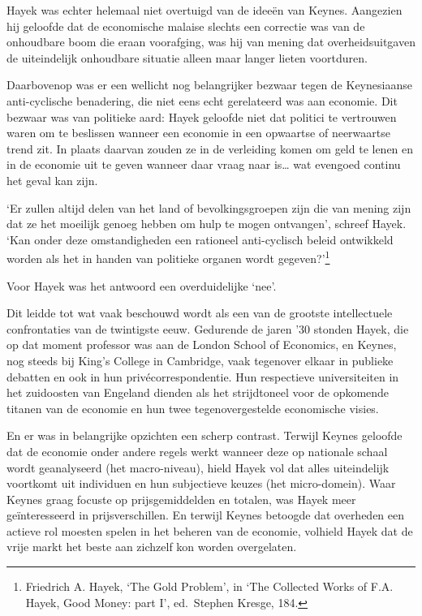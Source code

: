 \documentclass[smalldemyvopaper,11pt,twoside,onecolumn,openright,extrafontsizes,hidelinks]{memoir}
\begin{document}
Hayek was echter helemaal niet overtuigd van de ideeën van Keynes.
Aangezien hij geloofde dat de economische malaise slechts een correctie
was van de onhoudbare boom die eraan voorafging, was hij van mening dat
overheidsuitgaven de uiteindelijk onhoudbare situatie alleen maar langer
lieten voortduren.

Daarbovenop was er een wellicht nog belangrijker bezwaar tegen de
Keynesiaanse anti-cyclische benadering, die niet eens echt gerelateerd
was aan economie. Dit bezwaar was van politieke aard: Hayek geloofde
niet dat politici te vertrouwen waren om te beslissen wanneer een
economie in een opwaartse of neerwaartse trend zit. In plaats daarvan
zouden ze in de verleiding komen om geld te lenen en in de economie uit
te geven wanneer daar vraag naar is\ldots{} wat evengoed continu het
geval kan zijn.

`Er zullen altijd delen van het land of bevolkingsgroepen zijn die van
mening zijn dat ze het moeilijk genoeg hebben om hulp te mogen
ontvangen', schreef Hayek. `Kan onder deze omstandigheden een rationeel
anti-cyclisch beleid ontwikkeld worden als het in handen van politieke
organen wordt gegeven?'\footnote{\hspace{0pt}Friedrich A. Hayek, `The
  Gold Problem', in `The Collected Works of F.A. Hayek, Good Money: part
  I', ed.~Stephen Kresge, 184.}

Voor Hayek was het antwoord een overduidelijke `nee'.

Dit leidde tot wat vaak beschouwd wordt als een van de grootste
intellectuele confrontaties van de twintigste eeuw. Gedurende de jaren
'30 stonden Hayek, die op dat moment professor was aan de London School
of Economics, en Keynes, nog steeds bij King's College in Cambridge,
vaak tegenover elkaar in publieke debatten en ook in hun
privécorrespondentie. Hun respectieve universiteiten in het zuidoosten
van Engeland dienden als het strijdtoneel voor de opkomende titanen van
de economie en hun twee tegenovergestelde economische visies.

En er was in belangrijke opzichten een scherp contrast. Terwijl Keynes
geloofde dat de economie onder andere regels werkt wanneer deze op
nationale schaal wordt geanalyseerd (het macro-niveau), hield Hayek vol
dat alles uiteindelijk voortkomt uit individuen en hun subjectieve
keuzes (het micro-domein). Waar Keynes graag focuste op prijsgemiddelden
en totalen, was Hayek meer geïnteresseerd in prijsverschillen. En
terwijl Keynes betoogde dat overheden een actieve rol moesten spelen in
het beheren van de economie, volhield Hayek dat de vrije markt het beste
aan zichzelf kon worden overgelaten.
\end{document}

